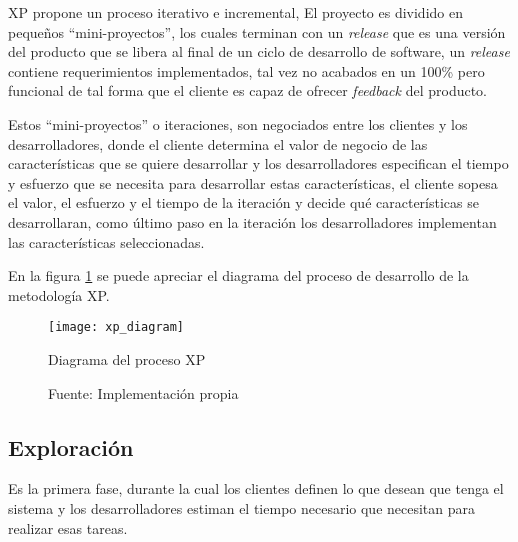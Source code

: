        XP propone un proceso iterativo e incremental, El proyecto es dividido en pequeños “mini-proyectos”, los cuales terminan con un \emph{release} que es una versión del producto que se libera al final de un ciclo de desarrollo de software, un \emph{release} contiene requerimientos implementados, tal vez no acabados en un  100\% pero funcional de tal forma que el cliente es capaz de ofrecer \emph{feedback} del producto. \cite{xp_overview}

       Estos ``mini-proyectos'' o iteraciones, son negociados entre los clientes y los desarrolladores, donde el cliente determina el valor de negocio de las características que se quiere desarrollar y los desarrolladores especifican el tiempo y esfuerzo que se necesita para desarrollar estas características, el cliente sopesa el valor, el esfuerzo y el tiempo de la iteración y decide qué características se desarrollaran, como último paso en la iteración los desarrolladores implementan las características seleccionadas.


           En la figura \ref{fig:xp_diagram} se puede apreciar el diagrama del proceso de desarrollo de la metodología XP.


     \begin{figure}[H]
       \begin{center}
         \texttt{[image: xp\_diagram]}
         \caption{Diagrama del proceso XP}
         \label{fig:xp_diagram}
         \caption*{Fuente: Implementación propia}
       \end{center}
     \end{figure}



       \subsection{Exploración}
       \label{sub:Exploracion}

       Es la primera fase, durante la cual los clientes definen lo que desean que tenga el sistema y los desarrolladores estiman el tiempo necesario que necesitan para realizar esas tareas.


